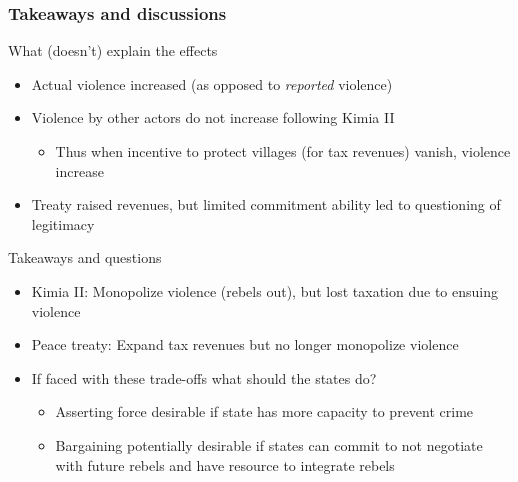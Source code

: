 \documentclass[aspectratio=169]{beamer}
\begin{document}
\begin{frame}
\frametitle{Takeaways and discussions} 
What (doesn't) explain the effects
\begin{itemize}\setlength\itemsep{3pt}
\item Actual violence increased (as opposed to \textit{reported} violence)
\item Violence by other actors do not increase following Kimia II
\begin{itemize}
\item Thus when incentive to protect villages (for tax revenues) vanish, violence increase
\end{itemize}
\item Treaty raised revenues, but limited commitment ability led to questioning of legitimacy
\end{itemize}\medskip
Takeaways and questions
\begin{itemize}\setlength\itemsep{3pt}
\item Kimia II: Monopolize violence (rebels out), but lost taxation due to ensuing violence
\item Peace treaty: Expand tax revenues but no longer monopolize violence
\item If faced with these trade-offs what should the states do?
\begin{itemize}\setlength\itemsep{3pt}
  \item Asserting force desirable if state has more capacity to prevent crime 
  \item Bargaining potentially desirable if states can commit to not negotiate with future rebels and have resource to integrate rebels
\end{itemize}
\end{itemize}
\end{frame}
\end{document}

